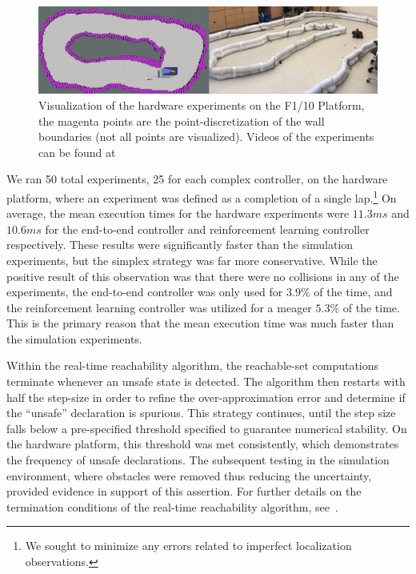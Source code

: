 \documentclass[manuscript,screen,review]{acmart}
\begin{document}
\begin{figure}[ht]%
  \centering
  \includegraphics[width=\linewidth]{figures/sidebyside.png}
  \caption{Visualization of the hardware experiments on the F1/10 Platform, the magenta points are the point-discretization of the wall boundaries (not all points are visualized). Videos of the experiments can be found at}
  \label{fig:lab_setup}
\end{figure}%
We ran 50 total experiments, 25 for each complex controller, on the hardware platform, where an experiment was defined as a completion of a single lap.\footnote{We sought to minimize any errors related to imperfect localization observations.} On average, the mean execution times for the hardware experiments were $11.3 ms$ and $10.6 ms$ for the end-to-end controller and reinforcement learning controller respectively. These results were significantly faster than the simulation experiments, but the simplex strategy was far more conservative. While the positive result of this observation was that there were no collisions in any of the experiments, the end-to-end controller was only used for $3.9\%$ of the time, and the reinforcement learning controller was utilized for a meager $5.3\%$ of the time. This is the primary reason that the mean execution time was much faster than the simulation experiments. 

Within the real-time reachability algorithm, the reachable-set computations terminate whenever an unsafe state is detected. The algorithm then restarts with half the step-size in order to refine the over-approximation error and determine if the ``unsafe'' declaration is spurious. This strategy continues, until the step size falls below a pre-specified threshold specified to guarantee numerical stability. On the hardware platform, this threshold was met consistently, which demonstrates the frequency of unsafe declarations. The subsequent testing in the simulation environment, where obstacles were removed thus reducing the uncertainty, provided evidence in support of this assertion. For further details on the termination conditions of the real-time reachability algorithm, see~\cite{Johnson2016}.
\end{document}
